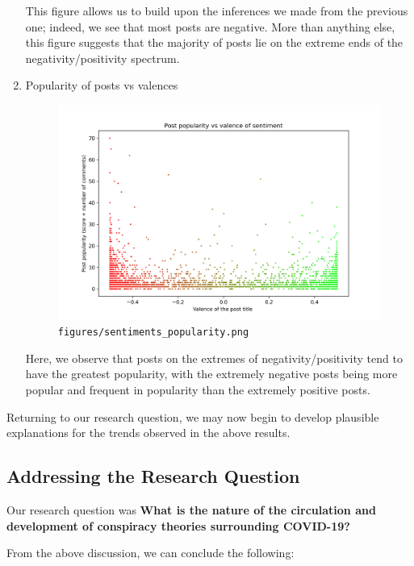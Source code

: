 \documentclass[fontsize=11pt]{article}
\begin{document}
\begin{enumerate}
    This figure allows us to build upon the inferences we made from the previous one; indeed, we see that most posts are negative. More than anything else, this figure suggests that the majority of posts lie on the extreme ends of the negativity/positivity spectrum.
    
    \item Popularity of posts vs valences 
    
    \begin{figure}[H]
        \centering
        \includegraphics[width=14cm]{figures/sentiments_popularity.png}
        \caption{\texttt{figures/sentiments\_popularity.png}}
    \end{figure}
    
    Here, we observe that posts on the extremes of negativity/positivity tend to have the greatest popularity, with the extremely negative posts being  more popular and frequent in popularity than the extremely positive posts.
    
\end{enumerate}


Returning to our research question, we may now begin to develop plausible explanations for the trends observed in the above results.

\subsection{Addressing the Research Question}

Our research question was \textbf{What is the nature of the circulation and development of conspiracy theories surrounding COVID-19?}

From the above discussion, we can conclude the following: 
\end{document}
